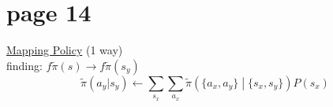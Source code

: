 \section*{page 14}

\underline{Mapping Policy} (1 way)\\

finding: $f\tilde{\pi}(s)\to f\tilde{\pi}(s_y)$\\

\begin{equation*}
\tilde{\pi}(a_y|s_y) \leftarrow \sum_{s_x}\sum_{a_x}\tilde{\pi}\left( \{ a_x, a_y \} \middle|  \{ s_x, s_y \} \right)P(s_x) 
\end{equation*}
